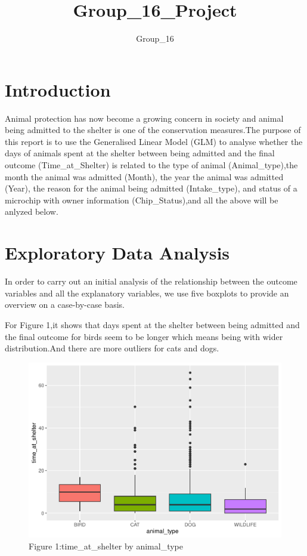 \documentclass[
]{article}
\title{Group\_16\_Project}
\author{Group\_16}
\date{}
\begin{document}
\maketitle

\hypertarget{sec:Intro}{%
\section{Introduction}\label{sec:Intro}}

Animal protection has now become a growing concern in society and animal
being admitted to the shelter is one of the conservation measures.The
purpose of this report is to use the Generalised Linear Model (GLM) to
analyse whether the days of animals spent at the shelter between being
admitted and the final outcome (Time\_at\_Shelter) is related to the
type of animal (Animal\_type),the month the animal was admitted (Month),
the year the animal was admitted (Year), the reason for the animal being
admitted (Intake\_type), and status of a microchip with owner
information (Chip\_Status),and all the above will be anlyzed below.

\hypertarget{sec:EDA}{%
\section{Exploratory Data Analysis}\label{sec:EDA}}

In order to carry out an initial analysis of the relationship between
the outcome variables and all the explanatory variables, we use five
boxplots to provide an overview on a case-by-case basis.

For Figure 1,it shows that days spent at the shelter between being
admitted and the final outcome for birds seem to be longer which means
being with wider distribution.And there are more outliers for cats and
dogs.

\begin{figure}[H]

{\centering \includegraphics[width=0.68\linewidth]{Group_16_Project_files/figure-latex/unnamed-chunk-2-1} 

}

\caption{\label{fig:box} Figure 1:time\_at\_shelter by animal\_type}\label{fig:unnamed-chunk-2}
\end{figure}
\end{document}
